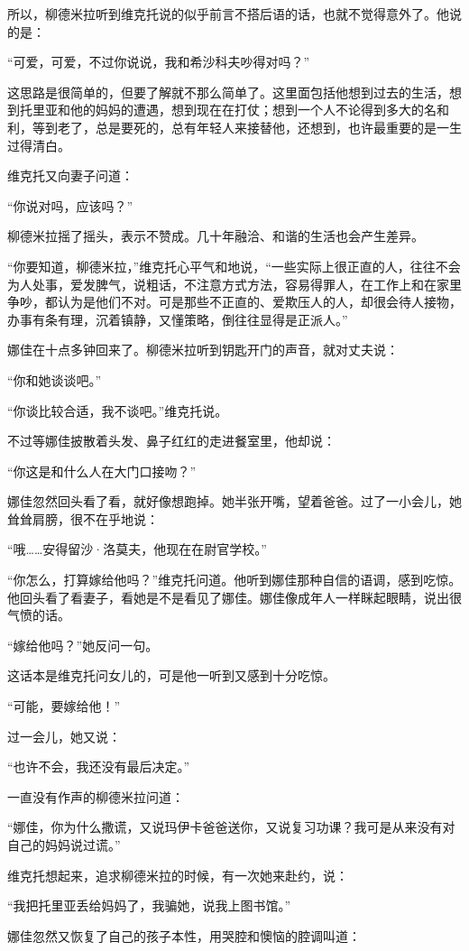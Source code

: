 所以，柳德米拉听到维克托说的似乎前言不搭后语的话，也就不觉得意外了。他说的是：

“可爱，可爱，不过你说说，我和希沙科夫吵得对吗？”

这思路是很简单的，但要了解就不那么简单了。这里面包括他想到过去的生活，想到托里亚和他的妈妈的遭遇，想到现在在打仗；想到一个人不论得到多大的名和利，等到老了，总是要死的，总有年轻人来接替他，还想到，也许最重要的是一生过得清白。

维克托又向妻子问道：

“你说对吗，应该吗？”

柳德米拉摇了摇头，表示不赞成。几十年融洽、和谐的生活也会产生差异。

“你要知道，柳德米拉，”维克托心平气和地说，“一些实际上很正直的人，往往不会为人处事，爱发脾气，说粗话，不注意方式方法，容易得罪人，在工作上和在家里争吵，都认为是他们不对。可是那些不正直的、爱欺压人的人，却很会待人接物，办事有条有理，沉着镇静，又懂策略，倒往往显得是正派人。”

娜佳在十点多钟回来了。柳德米拉听到钥匙开门的声音，就对丈夫说：

“你和她谈谈吧。”

“你谈比较合适，我不谈吧。”维克托说。

不过等娜佳披散着头发、鼻子红红的走进餐室里，他却说：

“你这是和什么人在大门口接吻？”

娜佳忽然回头看了看，就好像想跑掉。她半张开嘴，望着爸爸。过了一小会儿，她耸耸肩膀，很不在乎地说：

“哦……安得留沙·洛莫夫，他现在在尉官学校。”

“你怎么，打算嫁给他吗？”维克托问道。他听到娜佳那种自信的语调，感到吃惊。他回头看了看妻子，看她是不是看见了娜佳。娜佳像成年人一样眯起眼睛，说出很气愤的话。

“嫁给他吗？”她反问一句。

这话本是维克托问女儿的，可是他一听到又感到十分吃惊。

“可能，要嫁给他！”

过一会儿，她又说：

“也许不会，我还没有最后决定。”

一直没有作声的柳德米拉问道：

“娜佳，你为什么撒谎，又说玛伊卡爸爸送你，又说复习功课？我可是从来没有对自己的妈妈说过谎。”

维克托想起来，追求柳德米拉的时候，有一次她来赴约，说：

“我把托里亚丢给妈妈了，我骗她，说我上图书馆。”

娜佳忽然又恢复了自己的孩子本性，用哭腔和懊恼的腔调叫道：


